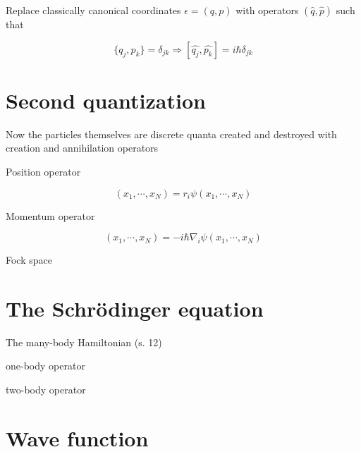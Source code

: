 Replace classically canonical coordinates $\epsilon = (q, p)$ with operators $(\hat{q}, \hat{p})$ such that

\begin{equation}
\{q_j, p_k\} = \delta_{jk} \Rightarrow [\hat{q_j}, \hat{p_k}] = i \hbar \delta_{jk}
\end{equation}

\section{Second quantization}

Now the particles themselves are discrete quanta created and destroyed with creation and annihilation operators

Position operator 

\begin{equation}
[\hat{r_i} \psi](x_1, \cdots, x_N) = r_i \psi (x_1, \cdots, x_N) 
\end{equation}

Momentum operator 

\begin{equation}
[\hat{p_i} \psi](x_1, \cdots, x_N) = -i \hbar \nabla_i \psi (x_1, \cdots, x_N) 
\end{equation}

Fock space

\section{The Schrödinger equation}

The many-body Hamiltonian (s. 12) 

one-body operator  

two-body operator

\section{Wave function}